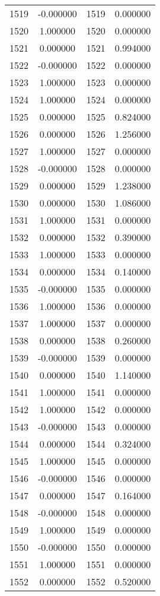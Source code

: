 \documentclass[12pt]{article}
\begin{document}
\begin{longtable}{@{}cccc@{}}
1519 & -0.000000 & 1519 & 0.000000 \\
1520 & 1.000000 & 1520 & 0.000000 \\
1521 & 0.000000 & 1521 & 0.994000 \\
1522 & -0.000000 & 1522 & 0.000000 \\
1523 & 1.000000 & 1523 & 0.000000 \\
1524 & 1.000000 & 1524 & 0.000000 \\
1525 & 0.000000 & 1525 & 0.824000 \\
1526 & 0.000000 & 1526 & 1.256000 \\
1527 & 1.000000 & 1527 & 0.000000 \\
1528 & -0.000000 & 1528 & 0.000000 \\
1529 & 0.000000 & 1529 & 1.238000 \\
1530 & 0.000000 & 1530 & 1.086000 \\
1531 & 1.000000 & 1531 & 0.000000 \\
1532 & 0.000000 & 1532 & 0.390000 \\
1533 & 1.000000 & 1533 & 0.000000 \\
1534 & 0.000000 & 1534 & 0.140000 \\
1535 & -0.000000 & 1535 & 0.000000 \\
1536 & 1.000000 & 1536 & 0.000000 \\
1537 & 1.000000 & 1537 & 0.000000 \\
1538 & 0.000000 & 1538 & 0.260000 \\
1539 & -0.000000 & 1539 & 0.000000 \\
1540 & 0.000000 & 1540 & 1.140000 \\
1541 & 1.000000 & 1541 & 0.000000 \\
1542 & 1.000000 & 1542 & 0.000000 \\
1543 & -0.000000 & 1543 & 0.000000 \\
1544 & 0.000000 & 1544 & 0.324000 \\
1545 & 1.000000 & 1545 & 0.000000 \\
1546 & -0.000000 & 1546 & 0.000000 \\
1547 & 0.000000 & 1547 & 0.164000 \\
1548 & -0.000000 & 1548 & 0.000000 \\
1549 & 1.000000 & 1549 & 0.000000 \\
1550 & -0.000000 & 1550 & 0.000000 \\
1551 & 1.000000 & 1551 & 0.000000 \\
1552 & 0.000000 & 1552 & 0.520000 \\

\end{longtable}
\end{document}
